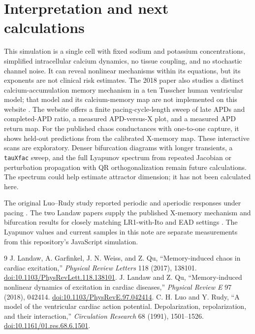 \documentclass[11pt]{article}
\begin{document}
\section{Interpretation and next calculations}

This simulation is a single cell with fixed sodium and potassium concentrations, simplified intracellular calcium dynamics, no tissue coupling, and no stochastic channel noise. It can reveal nonlinear mechanisms within its equations, but its exponents are not clinical risk estimates. The 2018 paper also studies a distinct calcium-accumulation memory mechanism in a ten Tusscher human ventricular model; that model and its calcium-memory map are not implemented on this website \cite{landaw2018}. The website offers a finite pacing-cycle-length sweep of late APDs and completed-APD ratio, a measured APD-versus-X plot, and a measured APD return map. For the published chaos conductances with one-to-one capture, it shows held-out predictions from the calibrated X-memory map. These interactive scans are exploratory. Denser bifurcation diagrams with longer transients, a \texttt{tauXfac} sweep, and the full Lyapunov spectrum from repeated Jacobian or perturbation propagation with QR orthogonalization remain future calculations. The spectrum could help estimate attractor dimension; it has not been calculated here.

The original Luo--Rudy study reported periodic and aperiodic responses under pacing \cite{luorudy1991}. The two Landaw papers supply the published X-memory mechanism and bifurcation results for closely matching LR1-with-Ito and EAD settings \cite{landaw2017,landaw2018}. The Lyapunov values and current samples in this note are separate measurements from this repository's JavaScript simulation.

\begin{thebibliography}{9}
 J. Landaw, A. Garfinkel, J. N. Weiss, and Z. Qu, ``Memory-induced chaos in cardiac excitation,'' \emph{Physical Review Letters} 118 (2017), 138101. \href{https://doi.org/10.1103/PhysRevLett.118.138101}{doi:10.1103/PhysRevLett.118.138101}.
 J. Landaw and Z. Qu, ``Memory-induced nonlinear dynamics of excitation in cardiac diseases,'' \emph{Physical Review E} 97 (2018), 042414. \href{https://doi.org/10.1103/PhysRevE.97.042414}{doi:10.1103/PhysRevE.97.042414}.
 C. H. Luo and Y. Rudy, ``A model of the ventricular cardiac action potential. Depolarization, repolarization, and their interaction,'' \emph{Circulation Research} 68 (1991), 1501--1526. \href{https://doi.org/10.1161/01.res.68.6.1501}{doi:10.1161/01.res.68.6.1501}.
\end{thebibliography}
\end{document}
